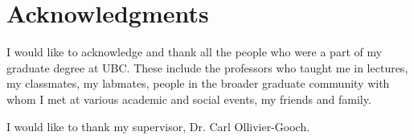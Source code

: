 
\chapter{Acknowledgments}

I would like to acknowledge and thank all the people who were a part of my graduate degree at UBC. These include the professors who taught me in lectures, my classmates, my labmates, people in the broader graduate community with whom I met at various academic and social events, my friends and family.

I would like to thank my supervisor, Dr. Carl Ollivier-Gooch. 



